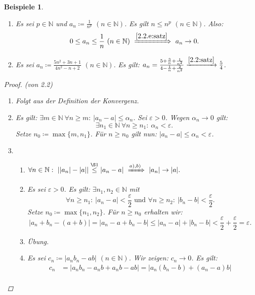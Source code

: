 \documentclass[12pt]{extreport} %
\newcommand{\N}{\mathbb{N}}
\theoremstyle{named}
\theoremstyle{itshape}
\theoremstyle{normal}
\newtheorem*{beispiele}{Beispiele}
\begin{document}
\begin{beispiele} \
	\begin{enumerate}
		\item Es sei $p \in \N$ und $a_{n} \coloneqq \frac{1}{n^{p}}$ $(n \in \N)$. Es gilt $n \leq n^{p}$ $(n \in \N)$. Also: 
			$$ 0 \leq a_{n} \leq \frac{1}{n} ~ (n \in \N) ~  \xRightarrow[]{\ref{2.2.e:satz}}   ~ a_{n} \rightarrow 0. $$
		\item Es sei $a_{n} \coloneqq \frac{5n^{2} + 3n + 1}{4n^{2} - n + 2}$ $(n \in \N)$. Es gilt: 
		      $a_n = \frac{5 + \frac{3}{n} + \frac{1}{n^{2}}}{4 - \frac{1}{n} + \frac{2}{n^{2}}} \xrightarrow[]{\ref{2.2:satz}} \frac{5}{4}$.
	\end{enumerate}
	
	\begin{proof}(von 2.2) ~\
		\begin{enumerate}
			\item Folgt aus der Definition der Konvergenz.
			\item   Es gilt: $\exists m \in \N ~ \forall n \geq m: ~ |a_{n} - a | \leq \alpha_{n}$. Sei $\varepsilon > 0$. Wegen $\alpha_n \to 0$ gilt:
				$$
		 		\exists n_{1} \in \N ~ \forall n \geq n_{1}:  ~ \alpha_{n} < \varepsilon.
		 		$$
		 		Setze $n_{0} \coloneqq \max \{ m , n_{1} \}$. Für $n \geq n_{0}$ gilt nun: $|a_{n} - a| \leq \alpha_{n} < \varepsilon$.
			\item \begin{enumerate}
				\item $\forall n \in \N: ~ | |a_{n}| - |a|| \overset{\S 1}{\leq} |a_{n} - a| ~ \xRightarrow[]{a), b)} ~ |a_{n}| \rightarrow |a|.$
				\item Es sei $\varepsilon > 0$. Es gilt: $\exists n_{1}, n_{2} \in \N$ mit 
				        $$
				        \forall n \geq n_{1}: ~ |a_{n} - a| < \frac{\varepsilon}{2}  \text{ und }  \forall n \geq n_{2}: ~ |b_{n} - b| < \frac{\varepsilon}{2}.
				        $$
					Setze $n_{0} \coloneqq \max \{ n_{1}, n_{2} \}$. Für $n \geq n_{0}$ erhalten wir:
					$$
						|a_{n} + b_{n} - (a + b)| = |a_{n} - a + b_{n} - b| \leq |a_{n} - a| + |b_{n} - b| 
						< \frac{\varepsilon}{2} + \frac{\varepsilon}{2} = \varepsilon.
					$$
				\item Übung.
				\item Es sei $c_{n} \coloneqq |a_{n} b_{n} - ab|$ $(n \in \N)$. Wir zeigen: $c_{n} \rightarrow 0$. Es gilt:
					\begin{align*}
						c_{n} & = |a_{n}b_{n} - a_{n}b + a_{n}b - ab| = |a_{n}(b_{n} - b)+ (a_{n} - a)b| \\

\end{align*}
\end{enumerate}
\end{enumerate}
\end{proof}
\end{beispiele}
\end{document}
